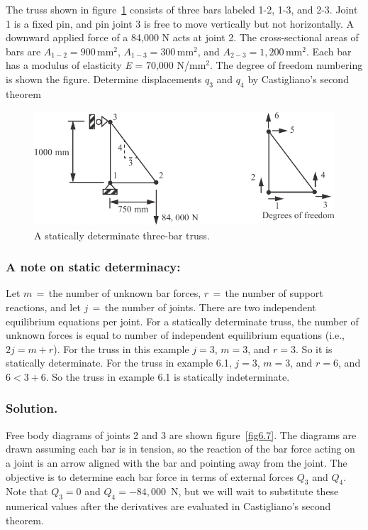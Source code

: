 \documentclass{AeroStructure-ERJohnson}
\begin{document}
\begin{example*}\label{ex6.3}The truss shown in figure~\ref{fig6.6} consists of three bars labeled 1-2, 1-3, and 2-3. Joint 1 is a fixed pin, and pin joint 3 is free to move vertically but not horizontally. A downward applied force of a 84,000 N acts at joint 2. The cross-sectional areas of bars are $A_{1-2}=900\,\mathrm{mm}^{2}$, $A_{1-3}=300\,\mathrm{mm}^{2}$, and $A_{2-3}=1,200\,\mathrm{mm}^{2}$. Each bar has a modulus of elasticity \textit{E} = 70,000 N/mm$^2$. The degree of freedom numbering is shown the figure. Determine displacements $q_3$ and $q_4$ by Castigliano's second theorem

\begin{figure}[!h]
\centerline{\includegraphics{Figure_6-6.pdf}}
\caption{A statically determinate three-bar truss.}\label{fig6.6}
\end{figure}

\subsubsection{A note on static determinacy:} Let $m\,{=}\,$the number of unknown bar forces, $r\,{=}\,$the number of support reactions, and let $j\,{=}\,$the number of joints. There are two independent equilibrium equations per joint. For a statically determinate truss, the number of unknown forces is equal to number of independent equilibrium equations (i.e., $2j = m + r$). For the truss in this example $j = 3$, $m = 3$, and $r = 3$. So it is statically determinate. For the truss in example 6.1, $j = 3$, $m = 3$, and $r = 6$, and $6 < 3 + 6$. So the truss in example 6.1 is statically indeterminate.

\subsubsection{Solution.} Free body diagrams of joints 2 and 3 are shown figure~\ref{fig6.7}. The diagrams are drawn assuming each bar is in tension, so the reaction of the bar force acting on a joint is an arrow aligned with the bar and pointing away from the joint. The objective is to determine each bar force in terms of external forces $Q_3$ and $Q_4$. Note that $Q_3 = 0$ and $Q_4 = -84{,}000$~N, but we will wait to substitute these numerical values after the derivatives are evaluated in Castigliano's second theorem.


\end{example*}
\end{document}
